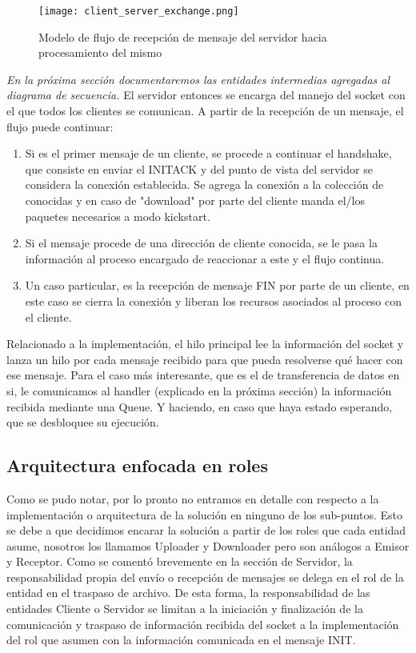 \documentclass[a4paper,10pt]{article}
\begin{document}
\begin{figure}[H]
    \centering
    \texttt{[image: client\_server\_exchange.png]}
    \caption{Modelo de flujo de recepción de mensaje del servidor hacia procesamiento del mismo}
    \label{fig:server-a-rol}
\end{figure}

\textit{En la próxima sección documentaremos las entidades intermedias agregadas al diagrama de secuencia.}
El servidor entonces se encarga del manejo del socket con el que todos los clientes se comunican. A partir de la recepción de un mensaje, el flujo puede continuar:
\begin{enumerate}
        \item Si es el primer mensaje de un cliente, se procede a continuar el handshake, que consiste en enviar el INITACK y del punto de vista del servidor se considera la conexión establecida. Se agrega la conexión a la colección de conocidas y en caso de "download" por parte del cliente manda el/los paquetes necesarios a modo kickstart.
        \item Si el mensaje procede de una dirección de cliente conocida, se le pasa la información al proceso encargado de reaccionar a este y el flujo continua.
        \item Un caso particular, es la recepción de mensaje FIN por parte de un cliente, en este caso se cierra la conexión y liberan los recursos asociados al proceso con el cliente.
\end{enumerate}
Relacionado a la implementación, el hilo principal lee la información del socket y lanza un hilo por cada mensaje recibido para que pueda resolverse qué hacer con ese mensaje. Para el caso más interesante, que es el de transferencia de datos en si, le comunicamos al handler (explicado en la próxima sección) la información recibida mediante una Queue. Y haciendo, en caso que haya estado esperando, que se desbloquee su ejecución.

\subsection{Arquitectura enfocada en roles}
Como se pudo notar, por lo pronto no entramos en detalle con respecto a la implementación o arquitectura de la solución en ninguno de los sub-puntos. Esto se debe a que decidimos encarar la solución a partir de los roles que cada entidad asume, nosotros los llamamos Uploader y Downloader pero son análogos a Emisor y Receptor.
Como se comentó brevemente en la sección de Servidor, la responsabilidad propia del envío o recepción de mensajes se delega en el rol de la entidad en el traspaso de archivo. De esta forma, la responsabilidad de las entidades Cliente o Servidor se limitan a la iniciación y finalización de la comunicación y traspaso de información recibida del socket a la implementación del rol que asumen con la información comunicada en el mensaje INIT.
\end{document}
